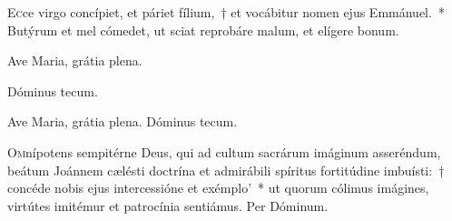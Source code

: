 \documentclass[vesperale_romanum.tex]{subfiles}
\begin{document}

\lettrine{E}{c}ce virgo concípiet, et páriet fílium,~† et vocábitur nomen ejus Emmánuel.~* Butýrum et mel cómedet, ut sciat reprobáre malum, et elígere bonum.

\amsrubrique%

\vv Ave Maria, grátia plena.

\rr Dóminus tecum.


\label{or_25_mar} \oratio



\commferiae

\bmvtone


\omniapraeter

\vv Ave Maria, grátia plena. \rr Dóminus tecum.


\myrule


\duplexmtv


\oratio

\lettrine{O}{m}nípotens sempitérne Deus, qui ad cultum sacrárum imáginum asseréndum, beátum Joánnem cælésti doctrína et admirábili spíritus fortitúdine imbuísti:~† concéde nobis ejus intercessióne et exémplo'~* ut quorum cólimus imágines, virtútes imitémur et patrocínia sentiámus.
Per Dóminum.

\commferiae


\myrule


\semiduplexmtv


\oratio
\end{document}
